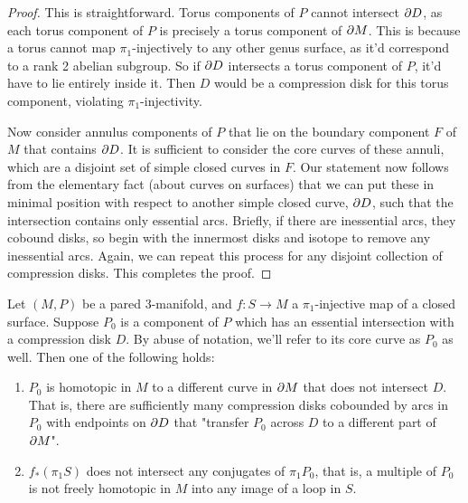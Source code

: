 \begin{proof}

This is straightforward. Torus components of $P$ cannot intersect $\partial D$, as
each torus component of $P$ is precisely a torus component of $\partial M$. This is
because a torus cannot map $\pi_1$-injectively to any other genus surface, as
it'd correspond to a rank 2 abelian subgroup. So if $\partial D$ intersects a torus
component of $P$, it'd have to lie entirely inside it. Then $D$ would be
a compression disk for this torus component, violating $\pi_1$-injectivity.

Now consider annulus components of $P$ that lie on the boundary component $F$
of $M$ that contains $\partial D$. It is sufficient to consider the core curves of
these annuli, which are a disjoint set of simple closed curves in $F$. Our
statement now follows from the elementary fact (about curves on surfaces) that
we can put these in minimal position with respect to another simple closed
curve, $\partial D$, such that the intersection contains only essential arcs.
Briefly, if there are inessential arcs, they cobound disks, so begin with the
innermost disks and isotope to remove any inessential arcs. Again, we can
repeat this process for any disjoint collection of compression disks. This
completes the proof.

\end{proof}

\begin{cor}

Let $(M,P)$ be a pared 3-manifold, and $f \colon S \to M$ a $\pi_1$-injective
map of a closed surface. Suppose $P_0$ is a component of $P$ which has an
essential intersection with a compression disk $D$. By abuse of notation, we'll
refer to its core curve as $P_0$ as well. Then one of the following holds:

\begin{enumerate}

\item $P_0$ is homotopic in $M$ to a different curve in $\partial M$ that does not
intersect $D$. That is, there are sufficiently many compression disks cobounded
by arcs in $P_0$ with endpoints on $\partial D$ that "transfer $P_0$ across $D$ to
a different part of $\partial M$".

\item $f_*(\pi_1S)$ does not intersect any conjugates of $\pi_1 P_0$, that is,
a multiple of $P_0$ is not freely homotopic in $M$ into any image of a loop in
$S$.

\end{enumerate}

\end{cor}

